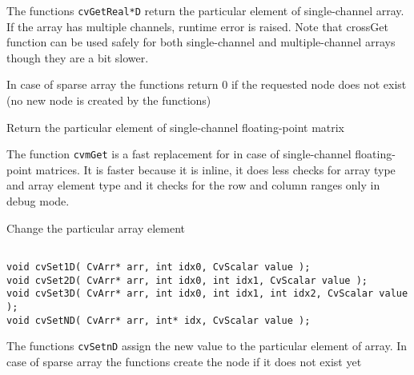 The functions \texttt{cvGetReal*D} return the particular element of single-channel array. If the array has multiple channels, runtime error is raised. Note that cross{Get} function can be used safely for both single-channel and multiple-channel arrays though they are a bit slower.

In case of sparse array the functions return 0 if the requested node does not exist (no new node is created by the functions)


Return the particular element of single-channel floating-point matrix


\begin{description}
\end{description}

The function \texttt{cvmGet} is a fast replacement for 
in case of single-channel floating-point matrices. It is faster because
it is inline, it does less checks for array type and array element type
and it checks for the row and column ranges only in debug mode.


Change the particular array element

\begin{lstlisting}

void cvSet1D( CvArr* arr, int idx0, CvScalar value );
void cvSet2D( CvArr* arr, int idx0, int idx1, CvScalar value );
void cvSet3D( CvArr* arr, int idx0, int idx1, int idx2, CvScalar value );
void cvSetND( CvArr* arr, int* idx, CvScalar value );

\end{lstlisting}

\begin{description}
\end{description}


The functions \texttt{cvSetnD} assign the new value to the particular element of array. In case of sparse array the functions create the node if it does not exist yet

